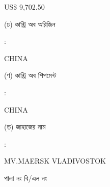 \documentclass[12pt]{article}
\newcommand{\price}{US\$ 9,702.50}
\newcommand{\co}{CHINA}
\newcommand{\coship}{CHINA}
\newcommand{\vessel}{MV.MAERSK VLADIVOSTOK}
\begin{document}
\begin{minipage}[t]{0.53\linewidth}
{\price}
\\
\end{minipage}
\begin{minipage}[t]{0.05\linewidth}
\hspace*{1em}
\end{minipage}
\begin{minipage}[t]{0.40\linewidth}
(ঢ) কান্ট্রি অব অরিজিন
\end{minipage}
\begin{minipage}[t]{0.02\linewidth}
:
\end{minipage}
\begin{minipage}[t]{0.53\linewidth}
{\co}
\\
\end{minipage}
\begin{minipage}[t]{0.05\linewidth}
\hspace*{1em}
\end{minipage}
\begin{minipage}[t]{0.40\linewidth}
(ণ) কান্ট্রি অব শিপমেন্ট
\end{minipage}
\begin{minipage}[t]{0.02\linewidth}
:
\end{minipage}
\begin{minipage}[t]{0.53\linewidth}
{\coship}
\\
\end{minipage}
\begin{minipage}[t]{0.05\linewidth}
\hspace*{1em}
\end{minipage}
\begin{minipage}[t]{0.40\linewidth}
(ত) জাহাজের নাম
\end{minipage}
\begin{minipage}[t]{0.02\linewidth}
:
\end{minipage}
\begin{minipage}[t]{0.53\linewidth}
{\vessel}
\end{minipage}
\begin{minipage}[t]{0.05\linewidth}
\hspace*{1em}
\end{minipage}
\begin{minipage}[t]{0.40\linewidth}
\hspace*{1.8em}পালা নং বি/এল নং
\end{minipage}
\begin{minipage}[t]{0.02\linewidth}
\hspace{1em}
\end{minipage}
\end{document}
